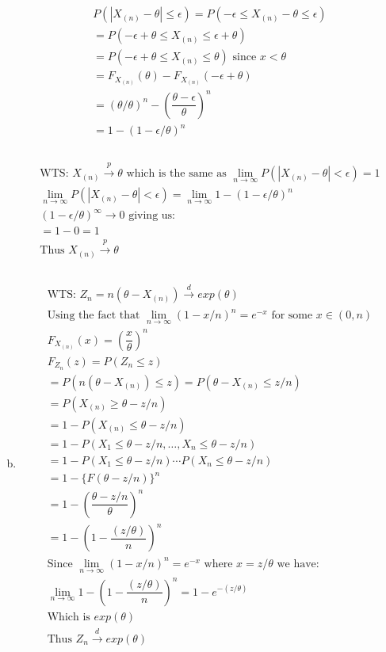 \documentclass{article}
\newcommand{\cd}{\overset{d}{\to}}
\newcommand{\cp}{\overset{p}{\to}}
\newcommand{\e}{\epsilon}
\begin{document}
\begin{flushleft}
\begin{enumerate}[(a)]
\begin{multline*}\\
P(|X_{(n)}-\theta|\leq \e)=P(-\e\leq X_{(n)}-\theta\leq \e)\\
=P(-\e+\theta\leq X_{(n)}\leq \e+\theta)\\
=P(-\e+\theta\leq X_{(n)}\leq \theta) \text{ since } x<\theta\\
=F_{X_{(n)}}(\theta)-F_{X_{(n)}}(-\e+\theta)\\
=(\theta/\theta)^n-\left(\dfrac{\theta-\e}{\theta}\right)^n\\
=1-(1-\e/\theta)^n\\
\end{multline*}

\begin{multline*}\\
\text{WTS: } X_{(n)}\cp \theta \text{ which is the same as } \lim_{n\to \infty} P(|X_{(n)}-\theta|<\e)=1\\
\lim_{n\to \infty} P(|X_{(n)}-\theta|<\e)=\lim_{n\to \infty}1-(1-\e/\theta)^n\\
 (1-\e/\theta)^{\infty}\to 0 \text{ giving us:}\\
=1-0=1\\
\text{Thus } X_{(n)}\cp \theta\\
\end{multline*}
\pagebreak
	\item 
\begin{multline*}\\
\text{WTS: } Z_n=n(\theta -X_{(n)})\cd exp(\theta)\\
\text{Using the fact that } \lim_{n\to \infty } (1-x/n)^n=e^{-x} \text{ for some } x\in (0,n)\\
F_{X_{(n)}}(x)=\left(\dfrac{x}{\theta}\right)^n\\
F_{Z_n}(z)=P(Z_n\leq z)\\
=P(n(\theta-X_{(n)})\leq z)=P(\theta-X_{(n)}\leq z/n)\\
=P(X_{(n)}\geq \theta-z/n)\\
=1-P(X_{(n)}\leq \theta-z/n)\\
=1-P(X_1\leq \theta-z/n,\dots,X_n\leq \theta-z/n)\\
=1-P(X_1\leq \theta-z/n)\cdots P(X_n\leq \theta-z/n)\\
=1-\{F(\theta-z/n)\}^n\\
=1-\left(\dfrac{\theta-z/n}{\theta}\right)^n\\
=1-\left(1-\dfrac{(z/\theta)}{n}\right)^n\\
\text{Since } \lim_{n\to \infty } (1-x/n)^n=e^{-x} \text{ where } x=z/\theta \text{ we have:}\\
\lim_{n\to \infty}1-\left(1-\dfrac{(z/\theta)}{n}\right)^n=1-e^{-(z/\theta)}\\
\text{Which is } exp(\theta)\\
\text{Thus } Z_n\cd exp(\theta)\\
\end{multline*}


\end{enumerate}
\end{flushleft}
\end{document}
